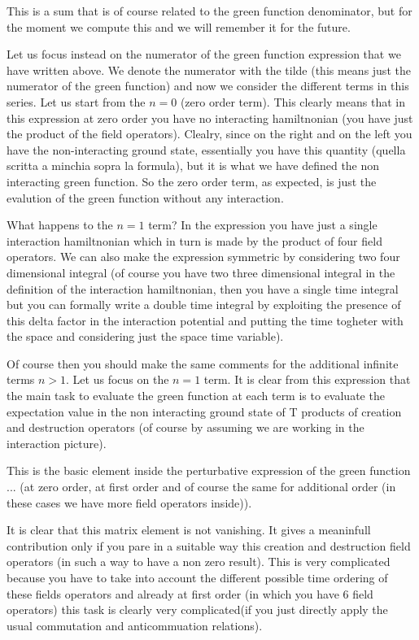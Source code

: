 \documentclass[../main/main.tex]{subfiles}
\begin{document}
This is a sum that is of course related to the green function denominator, but for the moment we compute this and we will remember it for the future.





Let us focus instead on the numerator of the green function expression that we have written above.
We denote the numerator with the tilde (this means just the numerator of the green function) and now we consider the different terms in this series. Let us start from the \( n=0 \) (zero order term). This clearly means that in this expression at zero order you have no interacting hamiltnonian (you have just the product of the field operators). Clealry, since on the right and on the left you have the non-interacting ground state, essentially you have this quantity (quella scritta a minchia sopra la formula), but it is what we have defined  the non interacting green function. So the zero order term, as expected, is just the evalution of the green function without any interaction.

What happens to the \( n=1 \) term? In the expression you have just a single interaction hamiltnonian which in turn is made by the product of four field operators. We can also make the expression symmetric by considering two four dimensional integral (of course you have two three dimensional integral in the definition of the interaction hamiltnonian, then you have a single time integral but you can formally write a double time integral by exploiting the presence of this delta factor in the interaction potential and putting the time togheter with the space and considering just the  space time variable).

Of course then you should make the same comments for the additional infinite terms \( n>1 \). Let us focus on the \( n=1 \) term. It is clear from this expression that the main task to evaluate the green function at each term is to evaluate the expectation value in the non interacting ground state of T products of creation and destruction operators (of course by assuming we are working in the interaction picture).

This is the basic element inside the perturbative expression of the green function
...
(at zero order, at first order and of course the same for additional order (in these cases we have more field operators inside)).


It is clear that this matrix element is not vanishing. It gives a meaninfull contribution only if you pare in a suitable way this creation and destruction field operators (in such a way to have a non zero result). This is very complicated because you have to take into account the different possible time ordering of these fields operators and already at first order (in which you have 6 field operators) this task is clearly very complicated(if you just directly apply the usual commutation and anticommuation relations).
\end{document}
